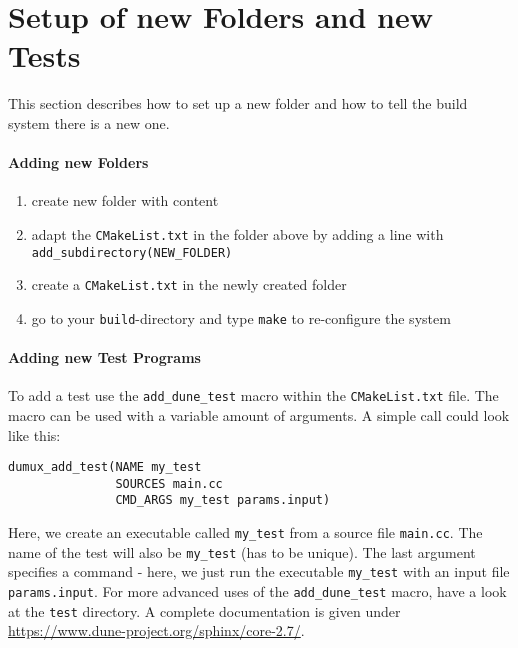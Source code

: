 \section{Setup of new Folders and new Tests}
\label{sc_newfoldersetup}
This section describes how to set up a new folder and how to tell
the build system there is a new one.
\paragraph{Adding new Folders}
\begin{enumerate}[1)]
 \item create new folder with content
 \item adapt the \verb+CMakeList.txt+ in the folder above by adding a line with
       \verb+add_subdirectory(NEW_FOLDER)+
 \item create a \verb+CMakeList.txt+ in the newly created folder
 \item go to your \texttt{build}-directory and type \verb+make+ to
       re-configure the system
\end{enumerate}

\paragraph{Adding new Test Programs}
\noindent To add a test use the \texttt{add\_dune\_test} macro within the \texttt{CMakeList.txt} file.
The macro can be used with a variable amount of arguments. A simple call could look like this:

\begin{lstlisting}[style=DumuxCode]
dumux_add_test(NAME my_test
               SOURCES main.cc
               CMD_ARGS my_test params.input)
\end{lstlisting}

Here, we create an executable called \texttt{my\_test} from a source file \texttt{main.cc}.
The name of the test will also be \texttt{my\_test} (has to be unique). The last argument specifies a command - here, we just run the executable \texttt{my\_test} with an input file \texttt{params.input}. For more advanced uses of
the \texttt{add\_dune\_test} macro, have a look at the \texttt{test} directory. A complete documentation is given under \url{https://www.dune-project.org/sphinx/core-2.7/}.
